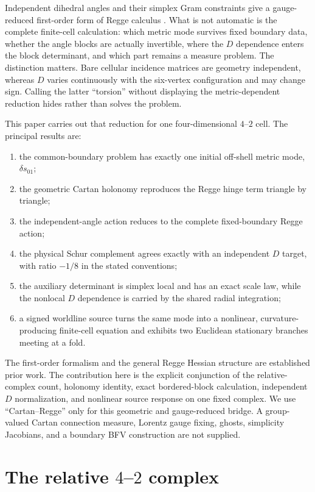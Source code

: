 \documentclass[11pt]{article}
\theoremstyle{definition}
\theoremstyle{remark}
\begin{document}
Independent dihedral angles and their simplex Gram constraints give a gauge-reduced first-order form of Regge calculus \cite{Barrett1994,DittrichSpeziale2008}.  What is not automatic is the complete finite-cell calculation: which metric mode survives fixed boundary data, whether the angle blocks are actually invertible, where the $D$ dependence enters the block determinant, and which part remains a measure problem.  The distinction matters.  Bare cellular incidence matrices are geometry independent, whereas $D$ varies continuously with the six-vertex configuration and may change sign.  Calling the latter ``torsion'' without displaying the metric-dependent reduction hides rather than solves the problem.

This paper carries out that reduction for one four-dimensional $4$--$2$ cell.  The principal results are:
\begin{enumerate}
\item the common-boundary problem has exactly one initial off-shell metric mode, $\delta s_{01}$;
\item the geometric Cartan holonomy reproduces the Regge hinge term triangle by triangle;
\item the independent-angle action reduces to the complete fixed-boundary Regge action;
\item the physical Schur complement agrees exactly with an independent $D$ target, with ratio $-1/8$ in the stated conventions;
\item the auxiliary determinant is simplex local and has an exact scale law, while the nonlocal $D$ dependence is carried by the shared radial integration;
\item a signed worldline source turns the same mode into a nonlinear, curvature-producing finite-cell equation and exhibits two Euclidean stationary branches meeting at a fold.
\end{enumerate}
The first-order formalism and the general Regge Hessian structure are established prior work.  The contribution here is the explicit conjunction of the relative-complex count, holonomy identity, exact bordered-block calculation, independent $D$ normalization, and nonlinear source response on one fixed complex.  We use ``Cartan--Regge'' only for this geometric and gauge-reduced bridge.  A group-valued Cartan connection measure, Lorentz gauge fixing, ghosts, simplicity Jacobians, and a boundary BFV construction are not supplied.

\section{The relative \texorpdfstring{$4$--$2$}{4--2} complex}
\end{document}
